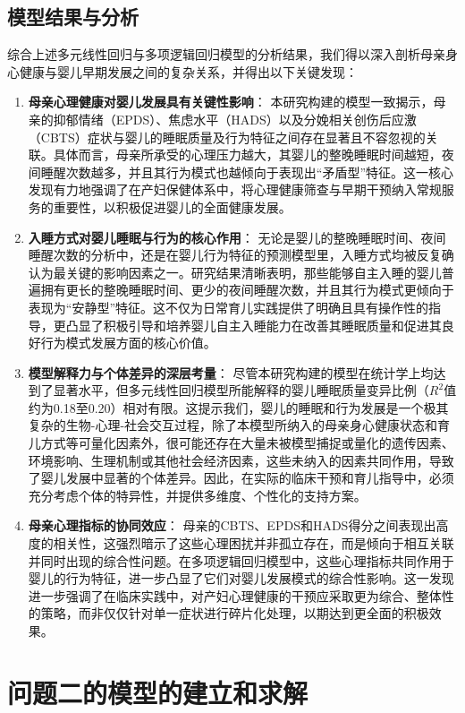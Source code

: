 \documentclass[withoutpreface,bwprint]{cumcmthesis}
\begin{document}
\subsection{模型结果与分析}
综合上述多元线性回归与多项逻辑回归模型的分析结果，我们得以深入剖析母亲身心健康与婴儿早期发展之间的复杂关系，并得出以下关键发现：

\begin{enumerate}
    \item \textbf{母亲心理健康对婴儿发展具有关键性影响}：
    本研究构建的模型一致揭示，母亲的抑郁情绪（EPDS）、焦虑水平（HADS）以及分娩相关创伤后应激（CBTS）症状与婴儿的睡眠质量及行为特征之间存在显著且不容忽视的关联。具体而言，母亲所承受的心理压力越大，其婴儿的整晚睡眠时间越短，夜间睡醒次数越多，并且其行为模式也越倾向于表现出“矛盾型”特征。这一核心发现有力地强调了在产妇保健体系中，将心理健康筛查与早期干预纳入常规服务的重要性，以积极促进婴儿的全面健康发展。
    \item \textbf{入睡方式对婴儿睡眠与行为的核心作用}：
    无论是婴儿的整晚睡眠时间、夜间睡醒次数的分析中，还是在婴儿行为特征的预测模型里，入睡方式均被反复确认为最关键的影响因素之一。研究结果清晰表明，那些能够自主入睡的婴儿普遍拥有更长的整晚睡眠时间、更少的夜间睡醒次数，并且其行为模式更倾向于表现为“安静型”特征。这不仅为日常育儿实践提供了明确且具有操作性的指导，更凸显了积极引导和培养婴儿自主入睡能力在改善其睡眠质量和促进其良好行为模式发展方面的核心价值。
    \item \textbf{模型解释力与个体差异的深层考量}：
    尽管本研究构建的模型在统计学上均达到了显著水平，但多元线性回归模型所能解释的婴儿睡眠质量变异比例（$R^2$值约为0.18至0.20）相对有限。这提示我们，婴儿的睡眠和行为发展是一个极其复杂的生物-心理-社会交互过程，除了本模型所纳入的母亲身心健康状态和育儿方式等可量化因素外，很可能还存在大量未被模型捕捉或量化的遗传因素、环境影响、生理机制或其他社会经济因素，这些未纳入的因素共同作用，导致了婴儿发展中显著的个体差异。因此，在实际的临床干预和育儿指导中，必须充分考虑个体的特异性，并提供多维度、个性化的支持方案。
    \item \textbf{母亲心理指标的协同效应}：
    母亲的CBTS、EPDS和HADS得分之间表现出高度的相关性，这强烈暗示了这些心理困扰并非孤立存在，而是倾向于相互关联并同时出现的综合性问题。在多项逻辑回归模型中，这些心理指标共同作用于婴儿的行为特征，进一步凸显了它们对婴儿发展模式的综合性影响。这一发现进一步强调了在临床实践中，对产妇心理健康的干预应采取更为综合、整体性的策略，而非仅仅针对单一症状进行碎片化处理，以期达到更全面的积极效果。
\end{enumerate}


\section{问题二的模型的建立和求解}
\end{document}
